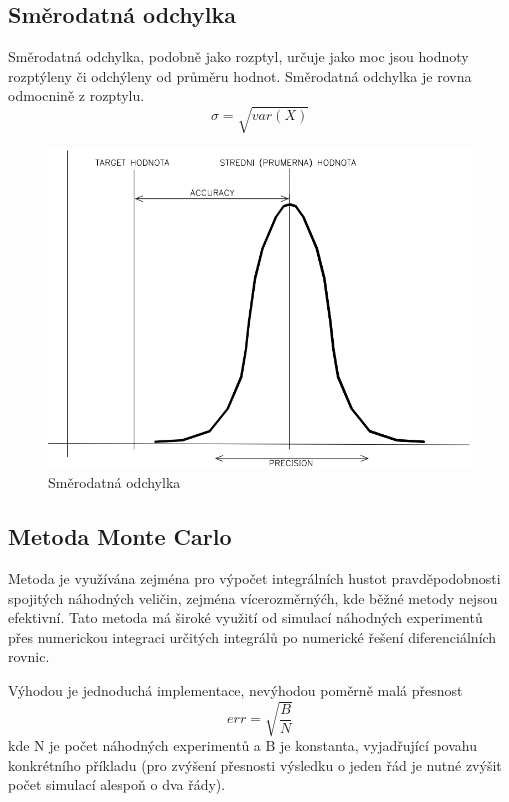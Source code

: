 \subsection{Směrodatná odchylka}
Směrodatná odchylka, podobně jako rozptyl, určuje jako moc jsou hodnoty rozptýleny či odchýleny od průměru hodnot. Směrodatná odchylka je rovna odmocnině z rozptylu.
\begin{equation}
\sigma = \sqrt{var(X)}
\end{equation}
\begin{figure}[h]
   \begin{center}
     \includegraphics[scale=0.5]{images/Smer.png}
   \end{center}
   \caption{Směrodatná odchylka}
\end{figure}
\subsection{Metoda Monte Carlo}
Metoda je využívána zejména pro výpočet integrálních hustot pravděpodobnosti spojitých náhodných veličin, zejména vícerozměrnýćh, kde běžné metody nejsou efektivní. Tato metoda má široké využití od simulací náhodných experimentů přes numerickou integraci určitých integrálů po numerické řešení diferenciálních rovnic.

Výhodou je jednoduchá implementace, nevýhodou poměrně malá přesnost
\begin{equation}
err = \sqrt{\frac{B}{N}}
\end{equation}
kde N je počet náhodných experimentů a B je konstanta, vyjadřující povahu konkrétního příkladu (pro zvýšení přesnosti výsledku o jeden řád je nutné zvýšit počet simulací alespoň o dva řády).


